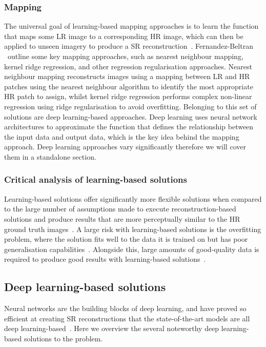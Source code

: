 \subsubsection{Mapping}
The universal goal of learning-based mapping approaches is to learn the function that maps some LR image to a corresponding HR image, which can then be applied to unseen imagery to produce a SR reconstruction~\cite{superResRemoteSensingOverview}. Fernandez-Beltran \etal\ outline some key mapping approaches, such as nearest neighbour mapping, kernel ridge regression, and other regression regularisation approaches. Nearest neighbour mapping reconstructs images using a mapping between LR and HR patches using the nearest neighbour algorithm to identify the most appropriate HR patch to assign, whilst kernel ridge regression performs complex non-linear regression using ridge regularisation to avoid overfitting. Belonging to this set of solutions are deep learning-based approaches. Deep learning uses neural network architectures to approximate the function that defines the relationship between the input data and output data, which is the key idea behind the mapping approach. Deep learning approaches vary significantly therefore we will cover them in a standalone section.

\subsubsection{Critical analysis of learning-based solutions}
Learning-based solutions offer significantly more flexible solutions when compared to the large number of assumptions made to execute reconstruction-based solutions and produce results that are more perceptually similar to the HR ground truth images~\cite{ref}. A large risk with learning-based solutions is the overfitting problem, where the solution fits well to the data it is trained on but has poor generalisation capabilities~\cite{ref}. Alongside this, large amounts of good-quality data is required to produce good results with learning-based solutions~\cite{superResRemoteSensingOverview}.

\subsection{Deep learning-based solutions}
Neural networks are the building blocks of deep learning, and have proved so efficient at creating SR reconstructions that the state-of-the-art models are all deep learning-based~\cite{ref}. Here we overview the several noteworthy deep learning-based solutions to the problem.

